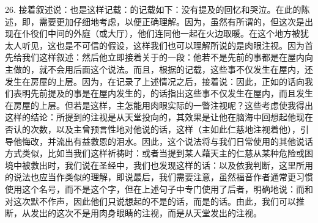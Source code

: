 26. 接着叙述说：也是这样记载：的记载如下：没有提及的回忆和哭泣。在此的陈述，即，需要更加仔细地考虑，以便正确理解。因为，虽然有所谓的，但这次是出现在仆役们中间的外庭（或大厅），他们连同他一起在火边取暖。在这个地方被犹太人听见，这也是不可信的假设，这样我们也可以理解所说的是肉眼注视。因为首先给我们这样叙述：然后他立即接着关于的一段：他若不是先前的事都是在屋内向主做的，就不会用后面这个说法。而且，根据的记载，这些事不仅发生在屋内，还发生在房屋的上层。因为，在记录了上述情况之后，接着说：因此，正如的话向我们表明先前提及的事是在屋内发生的，的话指出这些事不仅发生在屋内，而且发生在房屋的上层。但若是这样，主怎能用肉眼实际的一瞥注视呢？这些考虑使我得出这样的结论：所提到的注视是从天堂投向的，其效果是让他在脑海中回想起他现在否认的次数，以及主曾预言性地对他说的话，这样（主如此仁慈地注视着他），引导他悔改，并流出有益救恩的泪水。因此，这个说法将与我们日常使用的其他说话方式类似，比如当我们这样祈祷时：或者当提到某人藉天主的仁慈从某种危险或困境中被救出时，我们说在圣经中，我们也发现这样的话：以及依我判断，这里所用的说法也应当作类似的理解，即说最后，我们需要注意，虽然福音作者通常更习惯使用这个名号，而不是这个字，但在上述句子中专门使用了后者，明确地说：而和对这次默不作声，因此他们只说想起的不是的话，而是的话。由此，我们可以推断，从发出的这次不是用肉身眼睛的注视，而是从天堂发出的注视。\par

